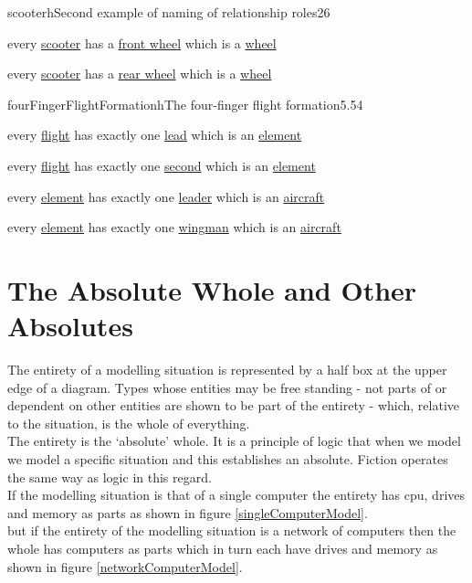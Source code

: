 \begin{erbulletedDimFig}{scooter}{h}{Second example of naming of relationship roles}{2}{6}
\item{every \underline{scooter} has a \underline{front wheel} which is a \underline{wheel}}
\item{every \underline{scooter} has a \underline{rear wheel} which is a \underline{wheel}}
\end{erbulletedDimFig}

\begin{erbulletedDimFig}{fourFingerFlightFormation}{h}{The four-finger flight formation}{5.5}{4}
\item{every \underline{flight} has exactly one \underline{lead} which is an \underline{element}}
\item{every \underline{flight} has exactly one \underline{second} which is an \underline{element}}
\item{every \underline{element} has exactly one \underline{leader}  which is an \underline{aircraft}}
\item{every \underline{element} has exactly one \underline{wingman} which is an \underline{aircraft}}
\end{erbulletedDimFig}

\section{The Absolute Whole and Other Absolutes}

The entirety of a modelling situation is represented by a half box at the upper edge of a diagram.
Types whose entities may be free standing - not parts of or dependent on other entities are shown to be 
part of the entirety - which, relative to the situation, is the whole of everything. \\

\noindent The entirety is the `absolute' whole. It is a principle of logic that when we model we model a 
specific situation and this establishes an absolute.
Fiction operates the same way as logic in this regard. \\

\noindent If the modelling situation is that of a single computer the entirety has 
cpu, drives and memory as parts as shown in figure \ref{singleComputerModel}.\\

\vspace{.2cm}
\noindent but if the entirety of the modelling situation is a network of computers then the whole has computers as parts which in turn each have drives and memory
as shown in figure \ref{networkComputerModel}.

